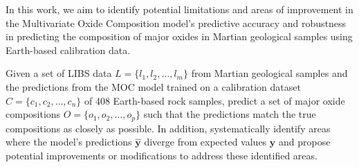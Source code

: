 

In this work, we aim to identify potential limitations and areas of improvement in the Multivariate Oxide Composition model's predictive accuracy and robustness in predicting the composition of major oxides in Martian geological samples using Earth-based calibration data.

Given a set of LIBS data \( L = \{ l_1, l_2, \dots, l_m \} \) from Martian geological samples and the predictions from the MOC model trained on a calibration dataset \( C = \{ c_1, c_2, \dots, c_n \} \) of 408 Earth-based rock samples, predict a set of major oxide compositions \( O = \{ o_1, o_2, \dots, o_p \} \) such that the predictions match the true compositions as closely as possible. In addition, systematically identify areas where the model's predictions $\mathbf{\hat{y}}$ diverge from expected values $\mathbf{y}$ and propose potential improvements or modifications to address these identified areas.

% 
% 


